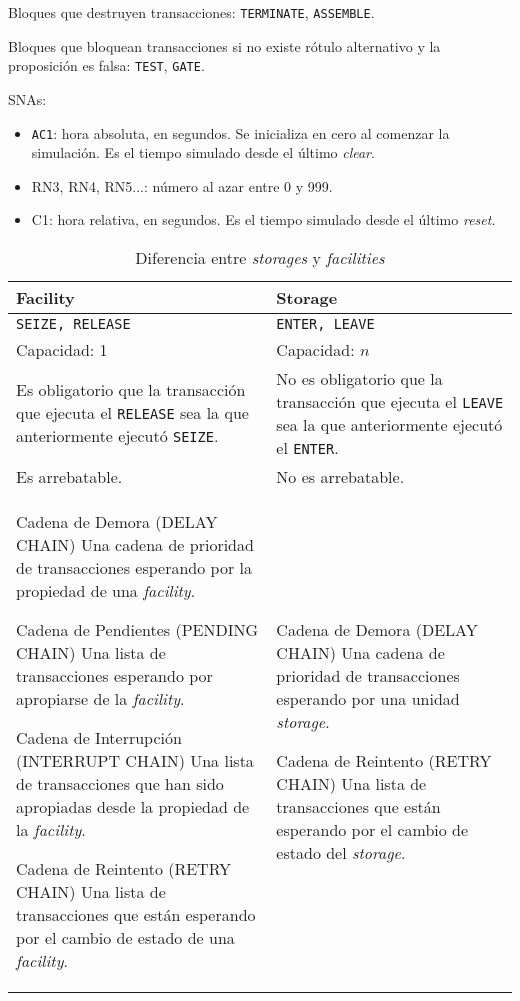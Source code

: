 \documentclass[12pt,a4paper, twoside]{paquetes-apunte/apunte}
\providecommand{\tabularnewline}{\\}
\begin{document}
Bloques que destruyen transacciones: \texttt{TERMINATE}, \texttt{ASSEMBLE}.

Bloques que bloquean transacciones si no existe rótulo alternativo
y la proposición es falsa: \texttt{TEST}, \texttt{GATE}.

SNAs:
\begin{itemize}
\item \texttt{AC1}: hora absoluta, en segundos. Se inicializa en cero al
comenzar la simulación. Es el tiempo simulado desde el último \emph{clear}.
\item RN3, RN4, RN5...: número al azar entre 0 y 999.
\item C1: hora relativa, en segundos. Es el tiempo simulado desde el último
\emph{reset}.
\end{itemize}
\noindent \begin{center}
\begin{table}[H]
\noindent \begin{centering}
\begin{tabular}{|>{\centering}p{8cm}|>{\centering}p{7cm}|}
\hline 
\textbf{Facility} & \textbf{Storage}\tabularnewline
\hline 
\hline 
\texttt{SEIZE, RELEASE} & \texttt{ENTER, LEAVE}\tabularnewline
\hline 
Capacidad: 1 & Capacidad: $n$\tabularnewline
\hline 
Es obligatorio que la transacción que ejecuta el \texttt{RELEASE}
sea la que anteriormente ejecutó \texttt{SEIZE}. & No es obligatorio que la transacción que ejecuta el \texttt{LEAVE}
sea la que anteriormente ejecutó el \texttt{ENTER}.\tabularnewline
\hline 
Es arrebatable. & No es arrebatable.\tabularnewline
\hline 
Cadena de Demora (DELAY CHAIN) \textendash{} Una cadena de prioridad
de transacciones esperando por la propiedad de una \emph{facility}.

Cadena de Pendientes (PENDING CHAIN) \textendash{} Una lista de transacciones
esperando por apropiarse de la \emph{facility}.

Cadena de Interrupción (INTERRUPT CHAIN) \textendash{} Una lista de
transacciones que han sido apropiadas desde la propiedad de la \emph{facility}.

Cadena de Reintento (RETRY CHAIN) \textendash{} Una lista de transacciones
que están esperando por el cambio de estado de una \emph{facility}. & Cadena de Demora (DELAY CHAIN) \textendash{} Una cadena de prioridad
de transacciones esperando por una unidad \emph{storage}. 

Cadena de Reintento (RETRY CHAIN) \textendash{} Una lista de transacciones
que están esperando por el cambio de estado del \emph{storage}.\tabularnewline
\hline 
\end{tabular}
\par\end{centering}

\caption{Diferencia entre \emph{storages} y \emph{facilities}}


\end{table}

\par\end{center}
\end{document}
